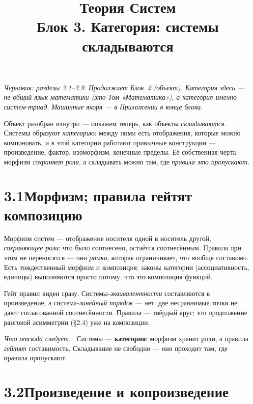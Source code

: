 \documentclass[12pt,a4paper]{article}
\title{\textbf{Теория Систем}\\[2mm]\large Блок 3. Категория: системы складываются}
\author{}
\date{}
\newcommand{\rezultat}{\medskip\noindent\emph{Что отсюда следует.}\ }
\begin{document}
\maketitle
\thispagestyle{empty}

\noindent\small\textit{Черновик: разделы 3.1--3.9. Продолжает Блок~2 (объект). Категория здесь ---
не общий язык математики (это Том «Математика»), а категория \emph{именно} систем-триад. Машинные
якоря --- в Приложении в конце блока.}\normalsize

\bigskip

\noindent Объект разобран изнутри --- покажем теперь, как объекты \emph{складываются}. Системы
образуют \emph{категорию}: между ними есть отображения, которые можно компоновать, и в этой
категории работают привычные конструкции --- произведение, фактор, изоморфизм, конечные пределы.
Её собственная черта: морфизм \emph{сохраняет роли}, а складывать можно там, где \emph{правила это
пропускают}.

\section*{3.1\quad Морфизм; правила гейтят композицию}

Морфизм систем --- отображение носителя одной в носитель другой, \emph{сохраняющее роли}: что было
соотнесено, остаётся соотнесённым. Правила при этом не переносятся --- они \emph{рамка}, которая
ограничивает, что вообще составимо. Есть тождественный морфизм и композиция; законы категории
(ассоциативность, единицы) выполняются просто потому, что это композиция функций.

Гейт правил виден сразу. Системы-\emph{эквивалентности} составляются в произведение, а
система-\emph{линейный порядок} --- нет: две несравнимые точки не дают согласованной соотнесённости.
Правила --- твёрдый ярус; это продолжение ранговой асимметрии (§2.4) уже на композиции.

\rezultat
Системы --- \textbf{категория}: морфизм хранит роли, а правила \emph{гейтят} составимость. Складывание
не свободно --- оно проходит там, где правила пропускают.

\section*{3.2\quad Произведение и копроизведение}
\end{document}
